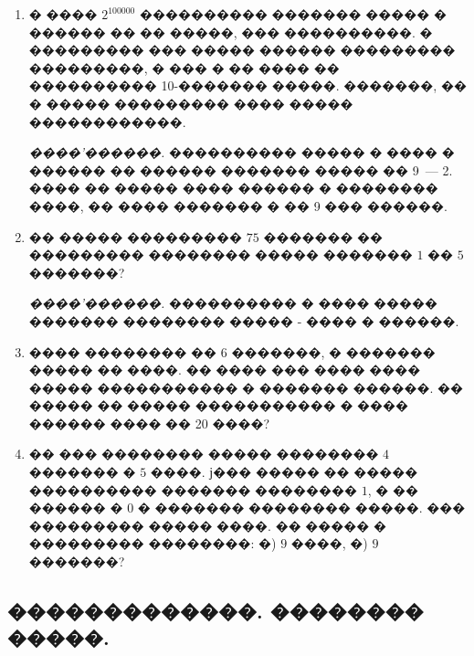\documentclass[a4paper,12pt]{article}
\begin{document}
\begin{enumerate}
\item � ���� $2^{100000}$ ���������� ������� ����� � ������ �� �� �����, ��� ����������. �
��������� ��� ����� ������ ��������� ���������, � ��� � �� ���� �� ���������� 10-������� �����. �������, �� � ����� ��������� ���� ����� ������������.

\textit{����'������.} ���������� ����� � ���� � ������ �� ������ ������� ����� �� 9~--- 2. ���� �� ����� ���� ������ � �������� ����, �� ���� ������� � �� 9 ��� ������.

\item �� ����� ��������� $75$ ������� �� ��������� �������� ����� ������� $1$ �� $5$ �������?

\textit{����'������.} ���������� � ���� ����� ������� �������� ����� - ���� � ������.

\item ���� �������� �� 6 �������, � ������� ����� �� ����. �� ���� ��� ���� ���� ����� ����������� � ������� ������. �� ����� �� ����� ����������� � ���� ������ ���� �� 20 ����?

\item �� ��� �������� ����� �������� $4$ ������� � $5$ ����. ϳ��� ����� �� �����
���������� ������� �������� $1$, � �� ������ � $0$ � ������� �������� �����. ���
��������� ����� ����. �� ����� � ��������� ��������: �) $9$ ����, �) $9$ �������?
\end{enumerate}








\newpage

\begin{center}
\section*{�������������. �������� �����.}
\end{center}

\medskip\medskip\medskip
\end{document}
